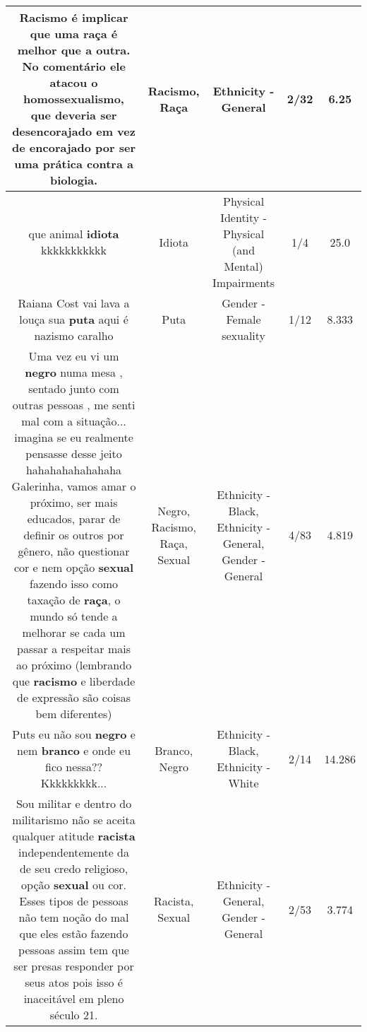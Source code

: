 \documentclass[11pt]{article}
\newlength\mylength
\begin{document}
\begin{center}
\begin{longtable}{|C{.65\mylength}|C{.30\mylength}|C{.12\mylength}|C{.12\mylength}|C{.12\mylength}|}
  \small Racismo é implicar que uma \textbf{raça} é melhor que a outra. No comentário ele atacou o homossexualismo, que deveria ser desencorajado em vez de encorajado por ser uma prática contra a biologia.\normalsize   & Racismo, Raça & Ethnicity - General & 2/32 & 6.25 \\  \hline
  \small que animal \textbf{idiota} kkkkkkkkkkk\normalsize   & Idiota & Physical Identity - Physical (and Mental) Impairments & 1/4 & 25.0 \\  \hline
  \small Raiana Cost vai lava a louça sua \textbf{puta} aqui é nazismo caralho\normalsize   & Puta & Gender - Female sexuality & 1/12 & 8.333 \\  \hline
  \small Uma vez eu vi um \textbf{negro} numa mesa , sentado junto com outras pessoas , me senti mal com a situação... imagina se eu realmente pensasse desse jeito hahahahahahahaha Galerinha, vamos amar o próximo, ser mais educados, parar de definir os outros por gênero, não questionar cor e nem opção \textbf{sexual} fazendo isso como taxação de \textbf{raça}, o mundo só tende a melhorar se cada um passar a respeitar mais ao próximo (lembrando que \textbf{racismo} e liberdade de expressão são coisas bem diferentes)\normalsize   & Negro, Racismo, Raça, Sexual & Ethnicity - Black, Ethnicity - General, Gender - General & 4/83 & 4.819 \\  \hline
  \small Puts eu não sou \textbf{negro} e nem \textbf{branco} e onde eu fico nessa?? Kkkkkkkkk...\normalsize   & Branco, Negro & Ethnicity - Black, Ethnicity - White & 2/14 & 14.286 \\  \hline
  \small Sou militar e dentro do militarismo não se aceita qualquer atitude \textbf{racista} independentemente  da de seu credo religioso, opção \textbf{sexual} ou cor. Esses tipos de pessoas não tem noção  do mal que eles estão fazendo pessoas assim tem que ser presas responder por seus atos pois isso é inaceitável em pleno século 21.\normalsize   & Racista, Sexual & Ethnicity - General, Gender - General & 2/53 & 3.774 \\  \hline

\end{longtable}
\end{center}
\end{document}
